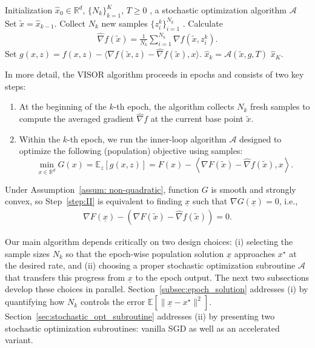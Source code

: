 \documentclass[11pt,twoside]{article}
\numberwithin{equation}{section}
\newcommand{\cA}{\mathcal{A}}
\newcommand{\EE}{\mathbb{E}}
\newcommand{\RR}{\mathbb{R}}
\newcommand{\1}{\mathbf{1}}
\newcommand{\dotp}[1]{\left\langle #1\right\rangle}
\theoremstyle{remark}
\theoremstyle{plain}
\newcommand{\algname}{\mathrm{VISOR}}
\begin{document}
\begin{algorithm}[H]
\caption{$\algname (\widehat x_0, \{N_k\}_{k=1}^{K}, T, \cA)$ }
\label{alg:metaVR}
\begin{algorithmic}[1]
  Initialization  $\widehat x_0 \in \RR^d$,  $\{N_k\}_{k=1}^{K}$, $T \ge 0$ , a stochastic optimization algorithm $\cA$ 
\State Set $ \tilde x = \widehat x_{k-1}$. Collect $N_k$ new samples $\{z_i^k\}_{i=1}^{N_k}$ .
\State Calculate 
\begin{align}\label{eqn:averging_meta}
	\widehat{\nabla} f(\tilde x) = \frac{1}{N_k} \sum_{i=1}^{N_k} \nabla f(\tilde x, z_i^k).
\end{align} 
\State Set $g(x,z) = f(x,z) - \langle \nabla f(\tilde x, z) - \widehat \nabla f(\tilde x), x \rangle$.
\State $\widehat x_k = \cA(\tilde x, g, T)$ \label{eqn:subroutine}
\EndFor
\State \Return $\widehat x_K$.
\end{algorithmic}
\end{algorithm}	
In more detail, the $\algname$ algorithm proceeds in epochs and consists of two key steps:
\begin{enumerate}
\item At the beginning of the $k$-th epoch, the algorithm collects $N_k$ fresh samples to compute the averaged gradient $\widehat \nabla f$ at the current base point $\tilde x$. 
\item\label{step:II} Within the $k$-th epoch, we run the inner-loop algorithm $\cA$ designed to optimize the following (population) objective using samples:
\begin{equation*}
\min_{x \in \RR^d} G(x) =  \EE_z [g(x,z)] =  F(x) - \dotp{\nabla F(\tilde x) - \widehat \nabla f(\tilde x), x}.
\end{equation*} 
\end{enumerate} 
Under Assumption~\ref{assum: non-quadratic}, function $G$ is smooth and strongly convex, so Step~\ref{step:II}  is equivalent to finding $\underline x$ such that $\nabla G(\underline x) = 0$, i.e.,
\begin{align} \label{eqn: underline_x_def}
\nabla F(\underline x) - (\nabla F(\tilde x) - \widehat \nabla f(\tilde x)) = 0.
\end{align}

Our main algorithm depends critically on two design choices: (i) selecting the sample sizes $N_k$ so that the epoch-wise population solution $\underline{x}$ approaches $x^\star$ at the desired rate, and (ii) choosing a proper stochastic optimization subroutine $\cA$ that transfers this progress from $\underline{x}$ to the epoch output. The next two subsections develop these choices in parallel. Section~\ref{subsec:epoch_solution} addresses (i) by quantifying how $N_k$ controls the error $\EE[\|\underline{x}-x^\star\|^2]$. Section~\ref{sec:stochastic_opt_subroutine} addresses (ii) by presenting two stochastic optimization subroutines: vanilla SGD as well as an accelerated variant.
\end{document}
